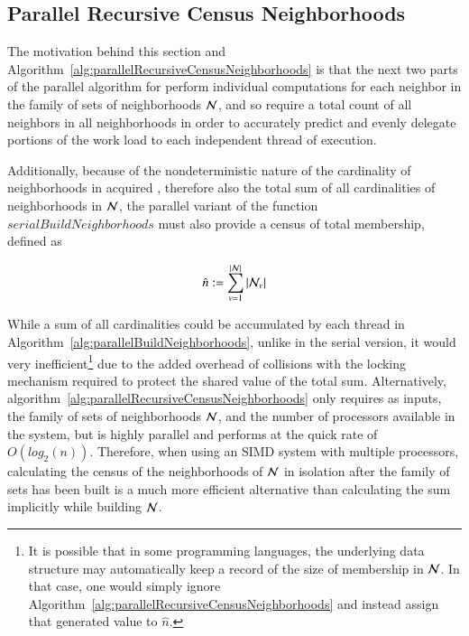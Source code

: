 %
%
\subsection{Parallel Recursive Census Neighborhoods}
\label{ch5sBNPssPRCN}
The motivation behind this section and Algorithm~\ref{alg:parallelRecursiveCensusNeighborhoods} is that the next two parts of the parallel algorithm for  perform individual computations for each neighbor in the family of sets of neighborhoods $\mathcal{N}$, and so require a total count of all neighbors in all neighborhoods in order to accurately predict and evenly delegate portions of the work load to each independent thread of execution. 

Additionally, because of the nondeterministic nature of the cardinality of neighborhoods in acquired \tdd{}, therefore also the total sum of all cardinalities of neighborhoods in $\mathcal{N}$, the parallel variant of the function $\mathit{serialBuildNeighborhoods}$ must also provide a census of total membership, defined as

\begin{equation}
	\hat{n} := \sum\limits_{v=1}^{|\mathcal{N}|}{|\mathcal{N}_v|}
	\label{eq:censusNeighborhoods}
\end{equation}%
%

While a sum of all cardinalities could be accumulated by each thread in  Algorithm~\ref{alg:parallelBuildNeighborhoods}, unlike in the serial version, it would very inefficient\footnote{It is possible that in some programming languages, the underlying data structure may automatically keep a record of the size of membership in $\mathcal{N}$. In that case, one would simply ignore Algorithm~\ref{alg:parallelRecursiveCensusNeighborhoods} and instead assign that generated value to $\hat{n}$.} due to the added overhead of collisions with the locking mechanism required to protect the shared value of the total sum.  Alternatively, algorithm~\ref{alg:parallelRecursiveCensusNeighborhoods} only requires as inputs, the family of sets of neighborhoods $\mathcal{N}$, and the number of processors available in the system, but is highly parallel and performs at the quick rate of $O(log_2(n))$. Therefore, when using an \gls{SIMD} system with multiple processors, calculating the census of the neighborhoods of $\mathcal{N}$ in isolation after the family of sets has been built is a much more efficient alternative than calculating the sum implicitly while building $\mathcal{N}$.

